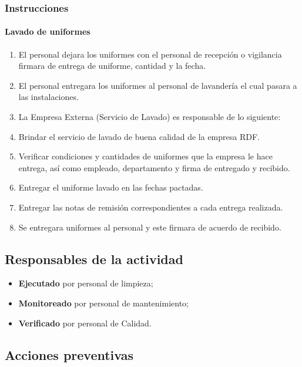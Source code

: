 \subsubsection{Instrucciones}

\paragraph{Lavado de uniformes}

\begin{enumerate}
	\item El personal dejara los uniformes con el personal de recepción o vigilancia firmara de entrega de uniforme, cantidad y la fecha.
	\item El personal entregara los uniformes al personal de lavandería el cual pasara a las instalaciones.
	\item La Empresa Externa (Servicio de Lavado) es responsable de lo siguiente:
	\item Brindar el servicio de lavado de buena calidad de la empresa \gls{RDF}.
	\item Verificar condiciones y cantidades de uniformes que la empresa le hace entrega, así como empleado, departamento y firma de entregado y recibido.
	\item Entregar el uniforme lavado en las fechas pactadas.
	\item Entregar las notas de remisión correspondientes a cada entrega realizada.
	\item Se entregara uniformes al personal y este firmara de acuerdo de recibido.
\end{enumerate}

\subsection{Responsables de la actividad}

\begin{itemize}
	\item \textbf{Ejecutado} por personal de limpieza;
	\item \textbf{Monitoreado} por personal de mantenimiento;
	\item \textbf{Verificado} por personal de Calidad.
\end{itemize}

\subsection{Acciones preventivas}

